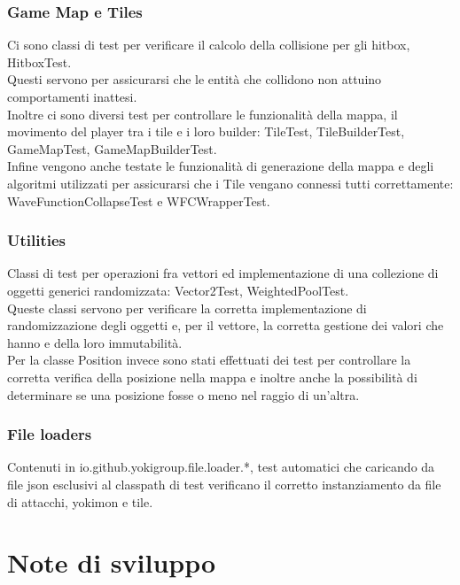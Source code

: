 \documentclass[a4paper,12pt]{report}
\begin{document}
\subsubsection{Game Map e Tiles}
Ci sono classi di test per verificare il calcolo della collisione per gli hitbox, HitboxTest. \\
%
Questi servono per assicurarsi che le entità che collidono non attuino comportamenti inattesi. \\
%
Inoltre ci sono diversi test per controllare le funzionalità della mappa, il movimento del player tra i tile e i loro builder: TileTest, TileBuilderTest, GameMapTest, GameMapBuilderTest. \\
%
Infine vengono anche testate le funzionalità di generazione della mappa e degli algoritmi utilizzati per assicurarsi che i Tile vengano connessi tutti correttamente: WaveFunctionCollapseTest e WFCWrapperTest.
\subsubsection{Utilities}
Classi di test per operazioni fra vettori ed implementazione di una collezione di oggetti generici randomizzata: Vector2Test, WeightedPoolTest. \\
%
Queste classi servono per verificare la corretta implementazione di randomizzazione degli oggetti e, per il vettore, la corretta gestione dei valori che hanno e della loro immutabilità. \\
%
Per la classe Position invece sono stati effettuati dei test per controllare la corretta verifica della posizione nella mappa e inoltre anche la possibilità di determinare se una posizione fosse o meno nel raggio di un’altra.
\subsubsection{File loaders}
Contenuti in io.github.yokigroup.file.loader.*, test automatici che caricando da file json esclusivi al classpath di test verificano il corretto instanziamento da file di attacchi, yokimon e tile.
\section{Note di sviluppo}
\end{document}

